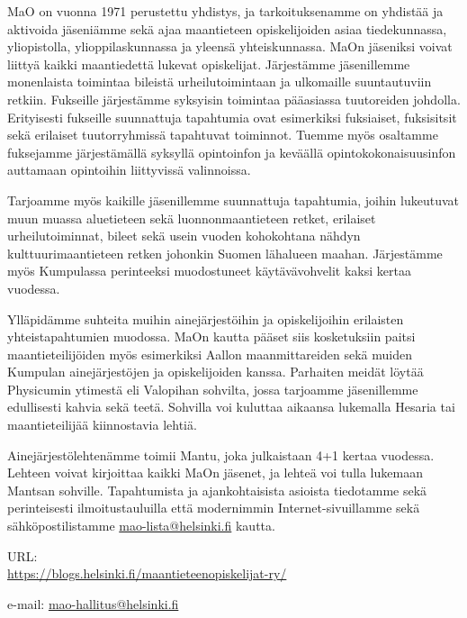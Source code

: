 \documentclass[a5paper, 8pt, twocolumn]{book} %
\numberwithin{equation}{section}
\begin{document}
MaO on vuonna 1971 perustettu yhdistys,
ja tarkoituksenamme on yhdistää ja aktivoida
jäseniämme sekä ajaa maantieteen
opiskelijoiden asiaa tiedekunnassa, yliopistolla,
ylioppilaskunnassa ja yleensä yhteiskunnassa.
MaOn jäseniksi voivat liittyä
kaikki maantiedettä lukevat opiskelijat.
Järjestämme jäsenillemme monenlaista
toimintaa bileistä urheilutoimintaan ja ulkomaille
suuntautuviin retkiin. Fukseille
järjestämme syksyisin toimintaa pääasiassa
tuutoreiden johdolla. Erityisesti fukseille
suunnattuja tapahtumia ovat esimerkiksi
fuksiaiset, fuksisitsit sekä erilaiset tuutorryhmissä
tapahtuvat toiminnot. Tuemme
myös osaltamme fuksejamme järjestämällä syksyllä opintoinfon ja keväällä
opintokokonaisuusinfon
auttamaan opintoihin liittyvissä
valinnoissa.

Tarjoamme myös kaikille jäsenillemme
suunnattuja tapahtumia, joihin lukeutuvat
muun muassa alue\-tieteen sekä luonnon\-maan\-tieteen
retket, erilaiset urheilu\-toiminnat,
bileet sekä usein vuoden kohokohtana
nähdyn kulttuuri\-maan\-tieteen retken johonkin
Suomen läh\-alueen maahan. Järjestämme
myös Kumpulassa perinteeksi
muodostuneet käytävä\-vohvelit kaksi kertaa
vuodessa.

Ylläpidämme suhteita muihin ainejärjestöihin
ja opiskelijoihin erilaisten yhteistapahtumien
muodossa. MaOn kautta
pääset siis kosketuksiin paitsi maantieteilijöiden
myös esimerkiksi Aallon maanmittareiden
sekä muiden Kumpulan ainejärjestöjen
ja opiskelijoiden kanssa.
Parhaiten meidät löytää Physicumin
ytimestä eli Valopihan sohvilta, jossa tarjoamme
jäsenillemme edullisesti kahvia
sekä teetä. Sohvilla voi kuluttaa aikaansa
lukemalla Hesaria tai maantieteilijää
kiinnostavia lehtiä.

Ainejärjestölehtenämme toimii Mantu,
joka julkaistaan 4+1 kertaa vuodessa. Lehteen
voivat kirjoittaa kaikki MaOn jäsenet,
ja lehteä voi tulla lukemaan Mantsan sohville. Tapahtumista ja ajankohtaisista
asioista tiedotamme sekä perinteisesti ilmoitustauluilla
että modernimmin Internet-sivuillamme sekä
sähköpostilistamme \url{mao-lista@helsinki.fi} kautta.

\noindent URL: \\\url{https://blogs.helsinki.fi/maantieteenopiskelijat-ry/}

\noindent e-mail: \url{mao-hallitus@helsinki.fi}
\end{document}

